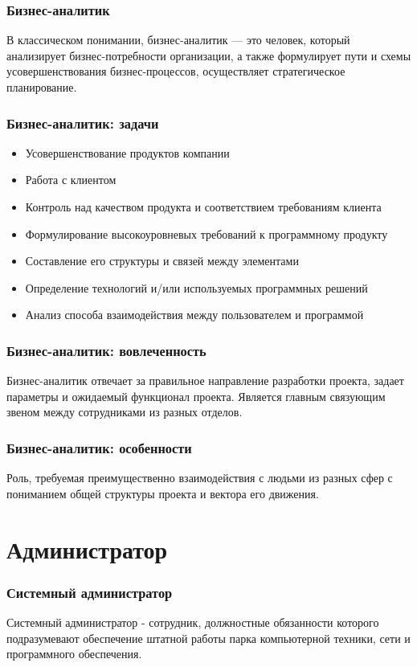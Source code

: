 \documentclass{../industrial-development}
\begin{document}
	\begin{frame} \frametitle{Бизнес-аналитик}
		\begin{block}{}
			\alert {}В классическом понимании, {бизнес-аналитик} — это человек, который анализирует бизнес-потребности организации, а также формулирует пути и схемы усовершенствования бизнес-процессов, осуществляет стратегическое планирование. 
		\end{block}
		
	\end{frame}
	
	\begin{frame} \frametitle{Бизнес-аналитик: задачи}
		\begin{itemize}
			\item Усовершенствование продуктов компании
			\item Работа с клиентом
			\item Контроль над качеством продукта и соответствием требованиям клиента
			\item Формулирование высокоуровневых требований к программному продукту
			\item Составление его структуры и связей между элементами
			\item Определение технологий и/или используемых программных решений
			\item Анализ способа взаимодействия между пользователем и программой
		\end{itemize}
	\end{frame}

	\begin{frame} \frametitle{Бизнес-аналитик: вовлеченность}
		Бизнес-аналитик отвечает за правильное направление разработки проекта, задает параметры и ожидаемый функционал проекта. Является главным связующим звеном между сотрудниками из разных отделов.
	\end{frame}
	
	\begin{frame} \frametitle{Бизнес-аналитик: особенности}
		Роль, требуемая преимущественно взаимодействия с людьми из разных сфер с пониманием общей структуры проекта и вектора его движения. 
	\end{frame}
	
	
	\section{Администратор} 
	
	\begin{frame} \frametitle{Системный администратор}
		\begin{block}{}
			\alert {Системный администратор} - сотрудник, должностные обязанности которого подразумевают обеспечение штатной работы парка компьютерной техники, сети и программного обеспечения.
		\end{block}
	\end{frame}
	
\end{document}
